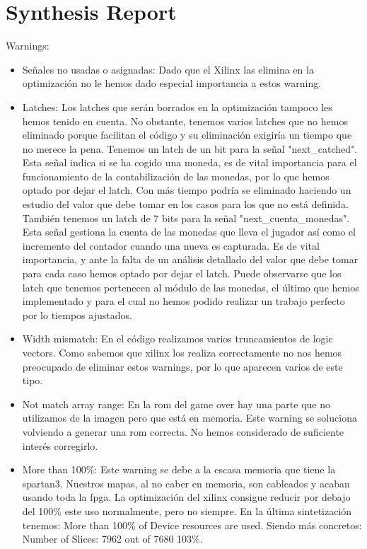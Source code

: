 \documentclass[11pt, a4paper, spanish, openright, twoside]{book}
\begin{document}
\section{Synthesis Report}

	Warnings:
	\begin{itemize}
	\item Señales no usadas o asignadas: Dado que el Xilinx las elimina en la optimización no le hemos dado especial importancia a estos warning.
	\item Latches: Los latches que serán borrados en la optimización tampoco les hemos tenido en cuenta. No obstante, tenemos varios latches que no hemos eliminado porque 
	facilitan el código y su eliminación exigiría un tiempo que no merece la pena.	Tenemos un latch de un bit para la señal "next\_catched". Esta señal indica si se ha cogido una moneda,
	es de vital importancia para el funcionamiento de la contabilización de las monedas, por lo que hemos optado por dejar el latch. Con más tiempo podría se eliminado haciendo un 
	estudio del valor que debe tomar en los casos para los que no está definida.	También tenemos un latch de 7 bits para la señal "next\_cuenta\_monedas". Esta señal gestiona
	 la cuenta de las monedas que lleva el jugador así como el incremento del contador cuando una nueva es capturada. Es de vital importancia, y ante la falta de un análisis detallado
	del valor que debe tomar para cada caso  hemos optado por dejar el latch. Puede observarse que los latch que tenemos pertenecen al módulo de las monedas, el último
	 que hemos implementado y para el cual no hemos podido realizar un trabajo perfecto por lo tiempos ajustados.	
	\item Width mismatch: En el código realizamos varios truncamientos de logic vectors. Como sabemos que xilinx los realiza correctamente no nos hemos preocupado de eliminar
	estos warnings, por lo que aparecen varios de este tipo.
	\item Not match array range: En la rom del game over hay una parte que no utilizamos de la imagen pero que está en memoria. Este warning se soluciona volviendo a generar una rom correcta.
	 No hemos considerado de suficiente interés corregirlo.
	\item More than 100\%: Este warning se debe a la escasa memoria que tiene la spartan3. Nuestros mapas, al no caber en memoria, son cableados y acaban usando toda la fpga. La optimización del xilinx 
	consigue reducir por debajo del 100\% este uso normalmente, pero no siempre. En la última sintetización tenemos: More than 100\% of Device resources are used. Siendo más concretos:	
	Number of Slices:  7962  out of   7680   103\%. 
\end{itemize}
\end{document}
